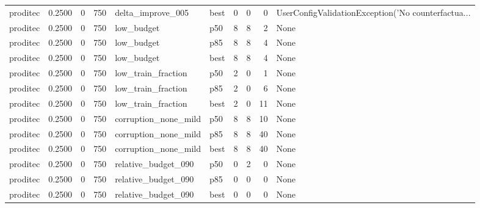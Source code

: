 \begin{tabular}{lrrrllrrrl}
proditec &    0.2500 &    0 &    750 &    delta\_improve\_005 &   best &               0 &          0 &       0 & UserConfigValidationException('No counterfactua... \\
proditec &    0.2500 &    0 &    750 &           low\_budget &    p50 &               8 &          8 &       2 &                                               None \\
proditec &    0.2500 &    0 &    750 &           low\_budget &    p85 &               8 &          8 &       4 &                                               None \\
proditec &    0.2500 &    0 &    750 &           low\_budget &   best &               8 &          8 &       4 &                                               None \\
proditec &    0.2500 &    0 &    750 &   low\_train\_fraction &    p50 &               2 &          0 &       1 &                                               None \\
proditec &    0.2500 &    0 &    750 &   low\_train\_fraction &    p85 &               2 &          0 &       6 &                                               None \\
proditec &    0.2500 &    0 &    750 &   low\_train\_fraction &   best &               2 &          0 &      11 &                                               None \\
proditec &    0.2500 &    0 &    750 & corruption\_none\_mild &    p50 &               8 &          8 &      10 &                                               None \\
proditec &    0.2500 &    0 &    750 & corruption\_none\_mild &    p85 &               8 &          8 &      40 &                                               None \\
proditec &    0.2500 &    0 &    750 & corruption\_none\_mild &   best &               8 &          8 &      40 &                                               None \\
proditec &    0.2500 &    0 &    750 &  relative\_budget\_090 &    p50 &               0 &          2 &       0 &                                               None \\
proditec &    0.2500 &    0 &    750 &  relative\_budget\_090 &    p85 &               0 &          0 &       0 &                                               None \\
proditec &    0.2500 &    0 &    750 &  relative\_budget\_090 &   best &               0 &          0 &       0 &                                               None \\

\end{tabular}
